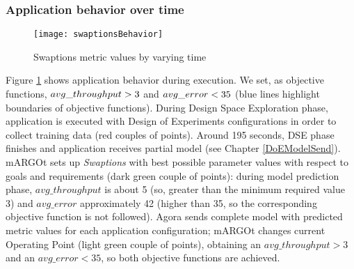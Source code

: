 \subsubsection{Application behavior over time}

\begin{figure}[htb]

    \centering
    
    \texttt{[image: swaptionsBehavior]}
    
    \caption{Swaptions metric values by varying time}
    
    \label{fig::sw::beh}
    
\end{figure}

Figure \ref{fig::sw::beh} shows application behavior during execution. We set, as objective functions, $avg\_\-throughput > 3$ and $avg\_\-error < 35$ (blue lines highlight boundaries of objective functions). During Design Space Exploration phase, application is executed with Design of Experiments configurations in order to collect training data (red couples of points). Around 195 seconds, DSE phase finishes and application receives partial model (see Chapter \ref{DoEModelSend}). mARGOt sets up \textit{Swaptions} with best possible parameter values with respect to goals and requirements (dark green couple of points): during model prediction phase, $avg\_throughput$ is about 5 (so, great\-er than the minimum required value 3) and $avg\_error$ approximately 42 (higher than 35, so the corresponding objective function is not followed). Agora sends complete model with predicted metric values for each application configuration; mARGOt changes current Operating Point (light green couple of points), obtaining an $avg\_throughput > 3$ and an $avg\_error < 35$, so both objective functions are achieved. 
